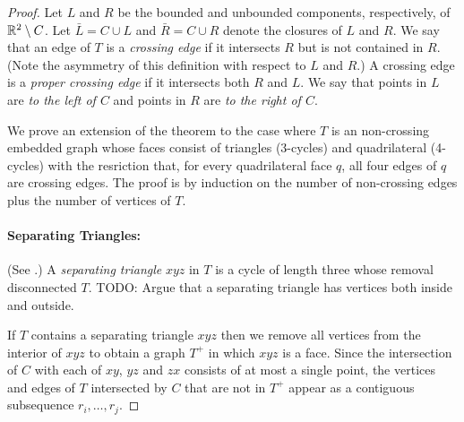 \documentclass{patmorin}
\begin{document}
\begin{proof}
   Let $L$ and $R$ be the bounded
   and unbounded components, respectively, of $\mathbb{R}^2\setminus C$. Let
   $\bar{L}=C\cup L$ and $\bar{R}=C\cup R$ denote the closures of $L$
   and $R$.  We say that an edge of $T$ is a \emph{crossing edge} if
   it intersects $R$ but is not contained in $R$.  (Note the asymmetry
   of this definition with respect to $L$ and $R$.)  A crossing edge
   is a \emph{proper crossing edge} if it intersects both $R$ and $L$.
   We say that points in $L$ are \emph{to the left of $C$} and points
   in $R$ are \emph{to the right of $C$}.

   We prove an extension of the theorem to the case where $T$ is an
   non-crossing embedded graph whose faces consist of triangles (3-cycles)
   and quadrilateral (4-cycles) with the resriction that, for every
   quadrilateral face $q$, all four edges of $q$ are crossing edges.
   The proof is by induction on the number of non-crossing edges plus the
   number of vertices of $T$.

%

   \paragraph{Separating Triangles:}
   (See .)
   A \emph{separating triangle} $xyz$ in $T$ is a cycle of length three
   whose removal disconnected $T$.  TODO: Argue that a separating triangle
   has vertices both inside and outside.

   If $T$ contains a separating triangle $xyz$ then we remove all vertices
   from the interior of $xyz$ to obtain a graph $T^+$ in which
   $xyz$ is a face.  Since the intersection of $C$ with each of $xy$,
   $yz$ and $zx$ consists of at most a single point, the vertices and
   edges of $T$ intersected by $C$ that are not in $T^+$ appear as a
   contiguous subsequence $r_i,\ldots,r_j$.


\end{proof}
\end{document}
